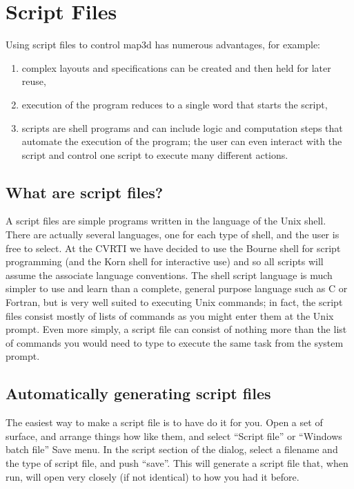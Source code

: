 
\section{Script Files}
\label{sec:scripts} 

Using script files to control map3d has numerous advantages, for example:

\begin{enumerate}
  \item complex layouts and specifications can be created and then held
        for later reuse,
  \item execution of the program reduces to a single word that starts the
        script,
  \item scripts are shell programs and can include logic and computation
        steps that automate the execution of the program; the user can even
        interact with the script and control one script to execute many
        different actions.
\end{enumerate}

\subsection{What are script files?}

A script files are simple programs written in the language of the Unix
shell.  There are actually several languages, one for each type of shell,
and the user is free to select.  At the CVRTI we have decided to use the
Bourne shell for script programming (and the Korn shell for interactive
use) and so all scripts will assume the associate language conventions.
The shell script language is much simpler to use and learn than a complete,
general purpose language such as C or Fortran, but is very well suited to
executing Unix commands; in fact, the script files consist mostly of lists
of commands as you might enter them at the Unix prompt.  Even more simply,
a script file can consist of nothing more than the list of commands you
would need to type to execute the same task from the system prompt.

\subsection{Automatically generating script files}
The easiest way to make a script file is to have \map{} do it for you.  Open a set
of surface, and arrange things how like them, and select ``Script file'' or ``Windows batch file'' 
Save menu.
In the script section of the dialog, select a filename and the type of script file, and 
push ``save''.  This will generate a script file that, when run, will open \map{} very closely
(if not identical) to how you had it before.

